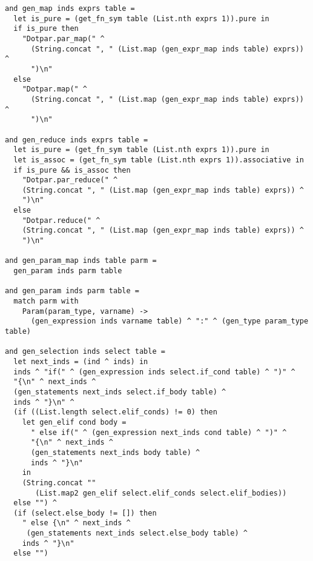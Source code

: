 \begin{verbatim}
and gen_map inds exprs table =
  let is_pure = (get_fn_sym table (List.nth exprs 1)).pure in
  if is_pure then
    "Dotpar.par_map(" ^
      (String.concat ", " (List.map (gen_expr_map inds table) exprs)) ^
      ")\n"
  else
    "Dotpar.map(" ^
      (String.concat ", " (List.map (gen_expr_map inds table) exprs)) ^
      ")\n"

and gen_reduce inds exprs table =
  let is_pure = (get_fn_sym table (List.nth exprs 1)).pure in
  let is_assoc = (get_fn_sym table (List.nth exprs 1)).associative in
  if is_pure && is_assoc then
    "Dotpar.par_reduce(" ^
    (String.concat ", " (List.map (gen_expr_map inds table) exprs)) ^
    ")\n"
  else
    "Dotpar.reduce(" ^
    (String.concat ", " (List.map (gen_expr_map inds table) exprs)) ^
    ")\n"

and gen_param_map inds table parm =
  gen_param inds parm table

and gen_param inds parm table =
  match parm with
    Param(param_type, varname) ->
      (gen_expression inds varname table) ^ ":" ^ (gen_type param_type table)

and gen_selection inds select table =
  let next_inds = (ind ^ inds) in
  inds ^ "if(" ^ (gen_expression inds select.if_cond table) ^ ")" ^
  "{\n" ^ next_inds ^
  (gen_statements next_inds select.if_body table) ^
  inds ^ "}\n" ^
  (if ((List.length select.elif_conds) != 0) then
    let gen_elif cond body =
      " else if(" ^ (gen_expression next_inds cond table) ^ ")" ^
      "{\n" ^ next_inds ^
      (gen_statements next_inds body table) ^
      inds ^ "}\n"
    in
    (String.concat ""
       (List.map2 gen_elif select.elif_conds select.elif_bodies))
  else "") ^
  (if (select.else_body != []) then
    " else {\n" ^ next_inds ^
     (gen_statements next_inds select.else_body table) ^
    inds ^ "}\n"
  else "")


\end{verbatim}
